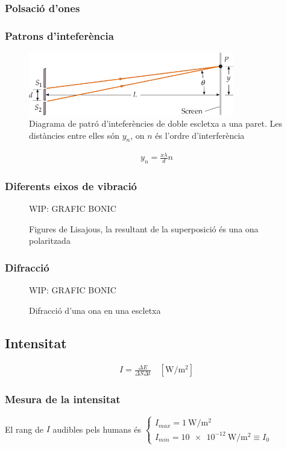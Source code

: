 \subsubsection*{Polsació d'ones}
\subsubsection*{Patrons d'inteferència}
\begin{figure}[H]
\centering
    \includegraphics[width=0.8\textwidth]{images/2/26-doble-escletxa.png}
\caption{Diagrama de patró d'inteferències de doble escletxa a una paret. Les distàncies entre elles són $y_{n}$, on $n$ és l'ordre d'interferència}
\end{figure}
\begin{align}
    \boxed{y_{n} = \frac{x \lambda}{d} n}
\end{align}
\subsubsection*{Diferents eixos de vibració}
\begin{figure}[H]
\centering
    WIP: GRAFIC BONIC 
\caption{Figures de Lisajous, la resultant de la superposició és una ona polaritzada}
\end{figure}
\subsubsection*{Difracció}
\begin{figure}[H]
\centering
    WIP: GRAFIC BONIC 
\caption{Difracció d'una ona en una escletxa}
\end{figure}
\subsection{Intensitat}
\begin{align}
    \boxed{I = \frac{\Delta E}{\Delta S \Delta t}} \quad \left[ \si{\W\per\m\squared} \right]
\end{align}

\subsubsection*{Mesura de la intensitat}
El rang de $I$ audibles pels humans és $\begin{cases} I_{max} = \SI{1}{\W\per\m\squared} \\ I_{min} = \SI{10 e-12}{\W\per\m\squared} \equiv I_{0} \end{cases}$


